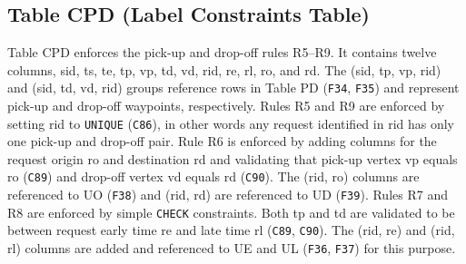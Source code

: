 \subsection{Table CPD (Label Constraints Table)}
Table CPD enforces the pick-up and drop-off rules R5--R9. It contains twelve
columns, \textsf{sid}, \textsf{ts}, \textsf{te}, \textsf{tp}, \textsf{vp},
\textsf{td}, \textsf{vd}, \textsf{rid}, \textsf{re}, \textsf{rl}, \textsf{ro},
and \textsf{rd}.  The (\textsf{sid}, \textsf{tp}, \textsf{vp}, \textsf{rid})
and (\textsf{sid}, \textsf{td}, \textsf{vd}, \textsf{rid}) groups reference
rows in Table PD ({\tt{}F34}, {\tt{}F35}) and represent pick-up and drop-off
waypoints, respectively.  Rules R5 and R9 are enforced by setting \textsf{rid}
to \texttt{UNIQUE} ({\tt{}C86}), in other words any request identified in
\textsf{rid} has only one pick-up and drop-off pair.  Rule R6 is enforced by
adding columns for the request origin \textsf{ro} and destination \textsf{rd}
and validating that pick-up vertex \textsf{vp} equals \textsf{ro} ({\tt{}C89}) and
drop-off vertex \textsf{vd} equals \textsf{rd} ({\tt{}C90}). The (\textsf{rid},
\textsf{ro}) columns are referenced to UO ({\tt{}F38}) and (\textsf{rid},
\textsf{rd}) are referenced to UD ({\tt{}F39}).  Rules R7 and R8 are enforced by
simple \texttt{CHECK} constraints. Both \textsf{tp} and \textsf{td} are
validated to be between request early time \textsf{re} and late time
\textsf{rl} ({\tt{}C89}, {\tt{}C90}). The (\textsf{rid}, \textsf{re}) and
(\textsf{rid}, \textsf{rl}) columns are added and referenced to UE and UL
({\tt{}F36}, {\tt{}F37}) for this purpose.

